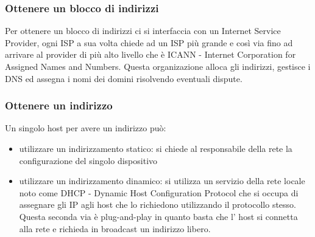 \subsubsection{Ottenere un blocco di indirizzi}
Per ottenere un blocco di indirizzi ci si interfaccia con un Internet Service Provider, ogni ISP a sua volta chiede ad un ISP più grande e così via fino ad arrivare al provider di più alto livello che è ICANN - Internet Corporation for Assigned Names and Numbers.
Questa organizazione alloca gli indirizzi, gestisce i DNS ed assegna i nomi dei domini risolvendo eventuali dispute.

\subsubsection{Ottenere un indirizzo}
Un singolo host per avere un indirizzo può:
\begin{itemize}
    \item utilizzare un indirizzamento statico: si chiede al responsabile della rete la configurazione del singolo dispositivo
    \item utilizzare un indirizzamento dinamico: si utilizza un servizio della rete locale noto come DHCP - Dynamic Host Configuration Protocol che si occupa di assegnare gli IP agli host che lo richiedono utilizzando il protocollo stesso.
    Questa seconda via è plug-and-play in quanto basta che l' host si connetta alla rete e richieda in broadcast un indirizzo libero.
\end{itemize}

